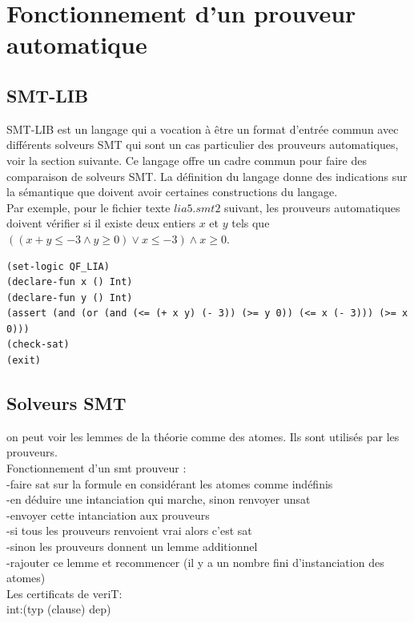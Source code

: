 \documentclass[11pt]{article}
\begin{document}
\newpage
\section{Fonctionnement d'un prouveur automatique}

\subsection{SMT-LIB}\label{smt-lib}

SMT-LIB est un langage qui a vocation à être un format d'entrée commun avec différents solveurs SMT qui sont un cas particulier des prouveurs automatiques, voir la section suivante. Ce langage offre un cadre commun pour faire des comparaison de solveurs SMT. La définition du langage \cite{smtlib} donne des indications sur la sémantique que doivent avoir certaines constructions du langage.\\

Par exemple, pour le fichier texte $lia5.smt2$ suivant, les prouveurs automatiques doivent vérifier si il existe deux entiers $x$ et $y$ tels que $ ((x + y \leq -3 \wedge y \geq 0) \vee x \leq -3) \wedge x \geq 0$.
\begin{lstlisting}[frame=single]
(set-logic QF_LIA)
(declare-fun x () Int)
(declare-fun y () Int)
(assert (and (or (and (<= (+ x y) (- 3)) (>= y 0)) (<= x (- 3))) (>= x 0)))
(check-sat)
(exit)
\end{lstlisting}

\subsection{Solveurs SMT} \label{smt}
on peut voir les lemmes de la théorie comme des atomes. Ils sont utilisés par les prouveurs. \\
Fonctionnement d'un smt prouveur :\\
-faire sat sur la formule en considérant les atomes comme indéfinis \\
-en déduire une intanciation qui marche, sinon renvoyer unsat \\
-envoyer cette intanciation aux prouveurs \\
-si tous les prouveurs renvoient vrai alors c'est sat \\
-sinon les prouveurs donnent un lemme additionnel \\
-rajouter ce lemme et recommencer (il y a un nombre fini d'instanciation des atomes)\\ 

Les certificats de veriT:\\
int:(typ (clause) dep)\\
\end{document}
